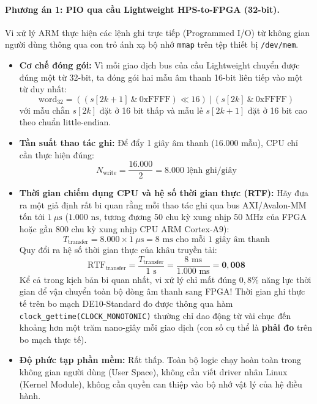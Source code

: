 \paragraph{Phương án 1: PIO qua cầu Lightweight HPS-to-FPGA (32-bit).}
Vi xử lý ARM thực hiện các lệnh ghi trực tiếp (Programmed I/O) từ không gian người dùng thông qua con trỏ ánh xạ bộ nhớ \texttt{mmap} trên tệp thiết bị \texttt{/dev/mem}.
\begin{itemize}[leftmargin=1.5em, itemsep=2pt]
    \item \textbf{Cơ chế đóng gói:} Vì mỗi giao dịch bus của cầu Lightweight chuyển được đúng một từ 32-bit, ta đóng gói hai mẫu âm thanh 16-bit liên tiếp vào một từ duy nhất:
    \begin{equation}
    \text{word}_{32} = ((s[2k+1] \ \& \ 0\text{xFFFF}) \ll 16) \ | \ (s[2k] \ \& \ 0\text{xFFFF})
    \end{equation}
    với mẫu chẵn $s[2k]$ đặt ở 16 bit thấp và mẫu lẻ $s[2k+1]$ đặt ở 16 bit cao theo chuẩn little-endian.
    \item \textbf{Tần suất thao tác ghi:} Để đẩy 1 giây âm thanh (16.000 mẫu), CPU chỉ cần thực hiện đúng:
    \begin{equation}
    N_{\text{write}} = \frac{16.000}{2} = 8.000\text{ lệnh ghi/giây}
    \end{equation}
    \item \textbf{Thời gian chiếm dụng CPU và hệ số thời gian thực (RTF):}
    Hãy đưa ra một giả định rất bi quan rằng mỗi thao tác ghi qua bus AXI/Avalon-MM tốn tới $1\ \mu\text{s}$ ($1.000\text{ ns}$, tương đương 50 chu kỳ xung nhịp 50 MHz của FPGA hoặc gần 800 chu kỳ xung nhịp CPU ARM Cortex-A9):
    \begin{equation}
    T_{\text{transfer}} = 8.000 \times 1\ \mu\text{s} = 8\text{ ms cho mỗi 1 giây âm thanh}
    \end{equation}
    Quy đổi ra hệ số thời gian thực của khâu truyền tải:
    \begin{equation}
    \text{RTF}_{\text{transfer}} = \frac{T_{\text{transfer}}}{1\text{ s}} = \frac{8\text{ ms}}{1.000\text{ ms}} = \mathbf{0{,}008}
    \end{equation}
    Kể cả trong kịch bản bi quan nhất, vi xử lý chỉ mất đúng $0{,}8\%$ năng lực thời gian để vận chuyển toàn bộ dòng âm thanh sang FPGA! Thời gian ghi thực tế trên bo mạch DE10-Standard đo được thông qua hàm \texttt{clock\_gettime(CLOCK\_MONOTONIC)} thường chỉ dao động từ vài chục đến khoảng hơn một trăm nano-giây mỗi giao dịch (con số cụ thể là \textbf{phải đo} trên bo mạch thực tế).
    \item \textbf{Độ phức tạp phần mềm:} Rất thấp. Toàn bộ logic chạy hoàn toàn trong không gian người dùng (User Space), không cần viết driver nhân Linux (Kernel Module), không cần quyền can thiệp vào bộ nhớ vật lý của hệ điều hành.
\end{itemize}


